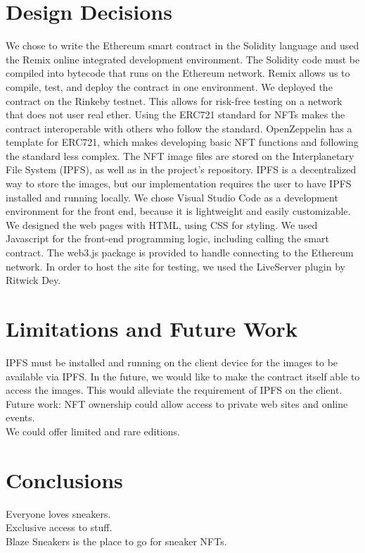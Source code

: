 \documentclass{article}
\begin{document}
\section{Design Decisions}
    We chose to write the Ethereum smart contract in the Solidity language and used the Remix online integrated development environment.
    The Solidity code must be compiled into bytecode that runs on the Ethereum network.
    Remix allows us to compile, test, and deploy the contract in one environment.
    We deployed the contract on the Rinkeby testnet. This allows for risk-free testing on a network that does not user real ether.
    \newline
    \indent
    Using the ERC721 standard for NFTs makes the contract interoperable with others who follow the standard.
    OpenZeppelin has a template for ERC721, which makes developing basic NFT functions and following the standard less complex.
    \newline
    \indent
    The NFT image files are stored on the Interplanetary File System (IPFS), as well as in the project's repository.
    IPFS is a decentralized way to store the images, but our implementation requires the user to have IPFS installed and running locally.
    \newline
    \indent
    We chose Visual Studio Code as a development environment for the front end, 
    because it is lightweight and easily customizable.
    We designed the web pages with HTML, using CSS for styling. 
    We used Javascript for the front-end programming logic, including calling the smart contract.
    The web3.js package is provided to handle connecting to the Ethereum network.
    In order to host the site for testing, we used the LiveServer plugin by Ritwick Dey.

\section{Limitations and Future Work}
    IPFS must be installed and running on the client device for the images to be available via IPFS. 
    In the future, we would like to make the contract itself able to access the images.
    This would alleviate the requirement of IPFS on the client.
    Future work: NFT ownership could allow access to private web sites and online events.\\
    We could offer limited and rare editions.

\section{Conclusions}
    Everyone loves sneakers. \\
    Exclusive access to stuff.\\
    Blaze Sneakers is the place to go for sneaker NFTs.
\end{document}
